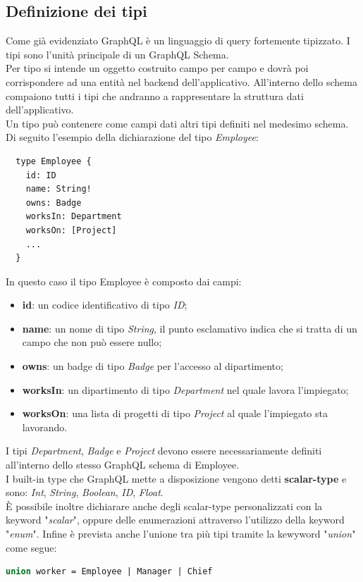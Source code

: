 \subsection{Definizione dei tipi}
Come già evidenziato GraphQL è un linguaggio di query fortemente tipizzato. I tipi sono l'unità principale di un GraphQL Schema.\\
Per tipo si intende un oggetto costruito campo per campo e dovrà poi corrispondere ad una entità nel backend dell'applicativo. All'interno dello schema compaiono tutti i tipi che andranno a rappresentare la struttura dati dell'applicativo.\\
Un tipo può contenere come campi dati altri tipi definiti nel medesimo schema. Di seguito l'esempio della dichiarazione del tipo \textit{Employee}:
\begin{verbatim}
  type Employee {
    id: ID
    name: String!
    owns: Badge
    worksIn: Department
    worksOn: [Project]
    ...
  }
\end{verbatim}
In questo caso il tipo Employee è composto dai campi:
\begin{itemize}
  \item \textbf{id}: un codice identificativo di tipo \textit{ID};
  \item \textbf{name}: un nome di tipo \textit{String}, il punto esclamativo indica che si tratta di un campo che non può essere nullo;
  \item \textbf{owns}: un badge di tipo \textit{Badge} per l'accesso al dipartimento;
  \item \textbf{worksIn}: un dipartimento di tipo \textit{Department} nel quale lavora l'impiegato;
  \item \textbf{worksOn}: una lista di progetti di tipo \textit{Project} al quale l'impiegato sta lavorando.
\end{itemize}
I tipi \textit{Department}, \textit{Badge} e \textit{Project} devono essere necessariamente definiti all'interno dello stesso GraphQL schema di Employee.\\
I built-in type che GraphQL mette a disposizione vengono detti \textbf{scalar-type} e sono: \textit{Int}, \textit{String}, \textit{Boolean}, \textit{ID}, \textit{Float}.\\
È possibile inoltre dichiarare anche degli scalar-type personalizzati con la keyword "\textit{scalar}", oppure delle enumerazioni attraverso l'utilizzo della keyword "\textit{enum}". Infine è prevista anche l'unione tra più tipi tramite la kewyword "\textit{union}" come segue:
\begin{lstlisting}[language=GraphQL,]
  union worker = Employee | Manager | Chief
\end{lstlisting}
